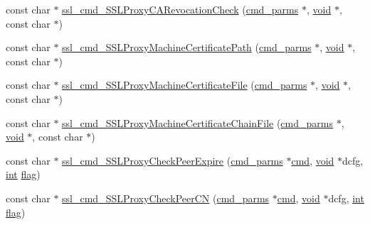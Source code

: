 \begin{DoxyCompactItemize}
\item 
const char $\ast$ \hyperlink{group__MOD__SSL__PRIVATE_ga8b5d15afdd7e5e95a0c0d6893030a247}{ssl\+\_\+cmd\+\_\+\+S\+S\+L\+Proxy\+C\+A\+Revocation\+Check} (\hyperlink{group__APACHE__CORE__CONFIG_ga1791fbd28d06a9847bad001541c5241e}{cmd\+\_\+parms} $\ast$, \hyperlink{group__MOD__ISAPI_gacd6cdbf73df3d9eed42fa493d9b621a6}{void} $\ast$, const char $\ast$)
\item 
const char $\ast$ \hyperlink{group__MOD__SSL__PRIVATE_ga6419a22d6f145e8c9938c39740fcdaf9}{ssl\+\_\+cmd\+\_\+\+S\+S\+L\+Proxy\+Machine\+Certificate\+Path} (\hyperlink{group__APACHE__CORE__CONFIG_ga1791fbd28d06a9847bad001541c5241e}{cmd\+\_\+parms} $\ast$, \hyperlink{group__MOD__ISAPI_gacd6cdbf73df3d9eed42fa493d9b621a6}{void} $\ast$, const char $\ast$)
\item 
const char $\ast$ \hyperlink{group__MOD__SSL__PRIVATE_ga8aa34c2ae9acfc109106407841231c65}{ssl\+\_\+cmd\+\_\+\+S\+S\+L\+Proxy\+Machine\+Certificate\+File} (\hyperlink{group__APACHE__CORE__CONFIG_ga1791fbd28d06a9847bad001541c5241e}{cmd\+\_\+parms} $\ast$, \hyperlink{group__MOD__ISAPI_gacd6cdbf73df3d9eed42fa493d9b621a6}{void} $\ast$, const char $\ast$)
\item 
const char $\ast$ \hyperlink{group__MOD__SSL__PRIVATE_ga09f8dd26dcb9da79d4786acaa7bdb156}{ssl\+\_\+cmd\+\_\+\+S\+S\+L\+Proxy\+Machine\+Certificate\+Chain\+File} (\hyperlink{group__APACHE__CORE__CONFIG_ga1791fbd28d06a9847bad001541c5241e}{cmd\+\_\+parms} $\ast$, \hyperlink{group__MOD__ISAPI_gacd6cdbf73df3d9eed42fa493d9b621a6}{void} $\ast$, const char $\ast$)
\item 
const char $\ast$ \hyperlink{group__MOD__SSL__PRIVATE_gad2009c8ecb89510a647770f4dbd490c0}{ssl\+\_\+cmd\+\_\+\+S\+S\+L\+Proxy\+Check\+Peer\+Expire} (\hyperlink{group__APACHE__CORE__CONFIG_ga1791fbd28d06a9847bad001541c5241e}{cmd\+\_\+parms} $\ast$\hyperlink{group__apr__thread__proc_ga7b715f5a87a71c6766684c1798251237}{cmd}, \hyperlink{group__MOD__ISAPI_gacd6cdbf73df3d9eed42fa493d9b621a6}{void} $\ast$dcfg, \hyperlink{pcre_8txt_a42dfa4ff673c82d8efe7144098fbc198}{int} \hyperlink{group__apr__mmap_gac9ec9a6de38e93927dca656ab65d0087}{flag})
\item 
const char $\ast$ \hyperlink{group__MOD__SSL__PRIVATE_gade1aa0a2e0ace51b6c58c1acc5e3d0ce}{ssl\+\_\+cmd\+\_\+\+S\+S\+L\+Proxy\+Check\+Peer\+CN} (\hyperlink{group__APACHE__CORE__CONFIG_ga1791fbd28d06a9847bad001541c5241e}{cmd\+\_\+parms} $\ast$\hyperlink{group__apr__thread__proc_ga7b715f5a87a71c6766684c1798251237}{cmd}, \hyperlink{group__MOD__ISAPI_gacd6cdbf73df3d9eed42fa493d9b621a6}{void} $\ast$dcfg, \hyperlink{pcre_8txt_a42dfa4ff673c82d8efe7144098fbc198}{int} \hyperlink{group__apr__mmap_gac9ec9a6de38e93927dca656ab65d0087}{flag})

\end{DoxyCompactItemize}
